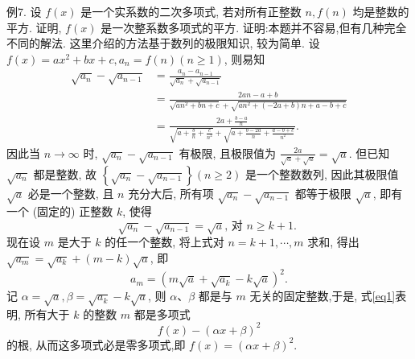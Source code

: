 例7. 设 $f(x)$ 是一个实系数的二次多项式, 若对所有正整数 $n, f(n)$ 均是整数的平方.
证明, $f(x)$ 是一次整系数多项式的平方.
证明:本题并不容易,但有几种完全不同的解法.
这里介绍的方法基于数列的极限知识, 较为简单.
设 $f(x)=a x^2+b x+c, a_n=f(n)(n \geqslant 1)$, 则易知
$$
\begin{aligned}
\sqrt{a_n}-\sqrt{a_{n-1}} & =\frac{a_n-a_{n-1}}{\sqrt{a_n}+\sqrt{a_{n-1}}} \\
& =\frac{2 a n-a+b}{\sqrt{a n^2+b n+c}+\sqrt{a n^2+(-2 a+b) n+a-b+c}} \\
& =\frac{2 a+\frac{b-a}{n}}{\sqrt{a+\frac{b}{n}+\frac{c}{n^2}}+\sqrt{a+\frac{b-2 a}{n}+\frac{a-b+c}{n^2}}} .
\end{aligned}
$$
因此当 $n \rightarrow \infty$ 时, $\sqrt{a_n}-\sqrt{a_{n-1}}$ 有极限, 且极限值为 $\frac{2 a}{\sqrt{a}+\sqrt{a}}=\sqrt{a}$. 但已知 $\sqrt{a_n}$ 都是整数, 故 $\left\{\sqrt{a_n}-\sqrt{a_{n-1}}\right\}(n \geqslant 2)$ 是一个整数数列, 因此其极限值 $\sqrt{a}$ 必是一个整数, 且 $n$ 充分大后, 所有项 $\sqrt{a_n}-\sqrt{a_{n-1}}$ 都等于极限 $\sqrt{a}$, 即有一个 (固定的) 正整数 $k$, 使得
$$
\sqrt{a_n}-\sqrt{a_{n-1}}=\sqrt{a} \text {, 对 } n \geqslant k+1 \text {. }
$$
现在设 $m$ 是大于 $k$ 的任一个整数, 将上式对 $n=k+1, \cdots, m$ 求和, 得出 $\sqrt{a_m}= \sqrt{a_k}+(m-k) \sqrt{a}$, 即
$$
a_m=\left(m \sqrt{a}+\sqrt{a_k}-k \sqrt{a}\right)^2 . \label{eq1}
$$
记 $\alpha=\sqrt{a}, \beta=\sqrt{a_k}-k \sqrt{a}$, 则 $\alpha 、 \beta$ 都是与 $m$ 无关的固定整数,于是, 式\ref{eq1}表明, 所有大于 $k$ 的整数 $m$ 都是多项式
$$
f(x)-(\alpha x+\beta)^2
$$
的根, 从而这多项式必是零多项式,即 $f(x)=(\alpha x+\beta)^2$.



